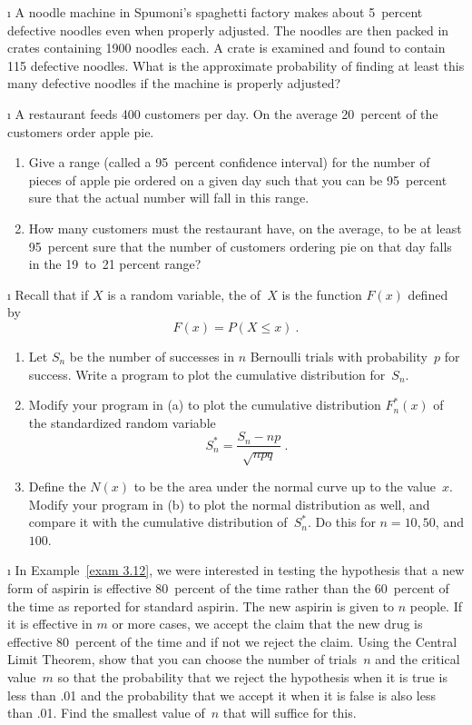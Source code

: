 \begin{LJSItem}
\i\label{exer 9.1.13}  A noodle machine in Spumoni's spaghetti factory makes about 5~percent
defective noodles even when properly adjusted.  The noodles are then packed in
crates containing 1900 noodles each.  A crate is examined and found to contain
115 defective noodles.  What is the approximate probability of finding at least
this many defective noodles if the machine is properly adjusted?

\i\label{exer 9.1.14}  A restaurant feeds 400 customers per day.  On the average 20~percent of
the customers order apple pie.
\begin{enumerate}
\item  Give a range (called a 95~percent confidence interval) for the number
of pieces of apple pie ordered on a given day such that you can be 95~percent
sure that the actual number will fall in this range.

\item  How many customers must the restaurant have, on the average, to be at
least 95~percent sure that the number of customers ordering pie on that day
falls in the 19~to~21 percent range?
\end{enumerate}

\i\label{exer 9.1.15}  Recall that if $X$ is a random variable, the  of~$X$ is the function $F(x)$ defined by
$$
F(x) = P(X \leq x)\ .
$$
\begin{enumerate}
\item  Let $S_n$ be the number of successes in $n$ Bernoulli trials with
probability~$p$ for success.  Write a program to plot the cumulative distribution
for~$S_n$.

\item  Modify your program in (a) to plot the
cumulative distribution $F_n^*(x)$ of the standardized random variable
$$
S_n^* = \frac {S_n - np}{\sqrt{npq}}\ .
$$

\item  Define the  $N(x)$ to be the area under the
normal curve up to the value~$x$.  Modify your program in
(b) to plot the normal distribution as well, and compare
it with the cumulative distribution of~$S_n^*$.  Do this for $n = 10, 50$, and $100$.
\end{enumerate}

\i\label{exer 9.1.16}  In Example~\ref{exam 3.12}, we were interested in testing the
hypothesis that a new form of aspirin is effective 80~percent of the time
rather than the 60~percent of the time as reported for standard aspirin.  The
new aspirin is given to $n$ people.  If it is effective in $m$ or more cases,
we accept the claim that the new drug is effective 80~percent of the time and
if not we reject the claim.  Using the Central Limit Theorem, show that you can
choose the number of trials~$n$ and the critical value~$m$ so that the
probability that we reject the hypothesis when it is true is less than .01 and
the probability that we accept it when it is false is also less than .01.  Find
the smallest value of~$n$ that will suffice for this.


\end{LJSItem}
